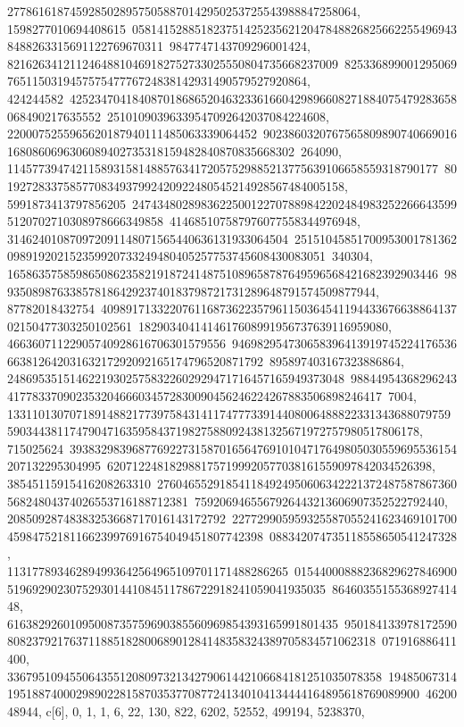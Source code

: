 {{{27786161874592850289575058870142950253725543988847258064, 1598277010694408615\
05814152885182375142523562120478488268256622554969438488263315691122769670311\
9847747143709296001424, 82162634121124648810469182752733025550804735668237009\
825336899001295069765115031945757547776724838142931490579527920864, 424244582\
42523470418408701868652046323361660429896608271884075479283658068490217635552\
25101090396339547092642037084224608, 2200075255965620187940111485063339064452\
90238603207675658098907406690161680860696306089402735318159482840870835668302\
264090, 114577394742115893158148857634172057529885213775639106658559318790177\
80192728337585770834937992420922480545214928567484005158, 5991873413797856205\
24743480289836225001227078898422024849832522666435995120702710308978666349858\
414685107587976077558344976948, 314624010870972091148071565440636131933064504\
25151045851700953001781362098919202152359920733249480405257753745608430083051\
340304, 165863575859865086235821918724148751089658787649596568421682392903446\
9893508987633857818642923740183798721731289648791574509877944, 87782018432754\
40989171332207611687362235796115036454119443367663886413702150477303250102561\
1829034041414617608991956737639116959080, 46636071122905740928616706301579556\
94698295473065839641391974522417653666381264203163217292092165174796520871792\
895897403167323886864, 248695351514622193025758322602929471716457165949373048\
98844954368296243417783370902353204666034572830090456246224267883506898246417\
7004, 13311013070718914882177397584314117477733914408006488822331343688079759\
590344381174790471635958437198275880924381325671972757980517806178, 715025624\
39383298396877692273158701656476910104717649805030559695536154207132295304995\
6207122481829881757199920577038161559097842034526398, 38545115915416208263310\
27604655291854118492495060634222137248758786736056824804374026553716188712381\
7592069465567926443213606907352522792440, 20850928748383253668717016143172792\
22772990595932558705524162346910170045984752181166239976916754049451807742398\
088342074735118558650541247328, 113177893462894993642564965109701171488286265\
01544000888236829627846900519692902307529301441084511786722918241059041935035\
8646035515536892741448, 61638292601095008735759690385560969854393165991801435\
95018413397817259080823792176371188518280068901284148358324389705834571062318\
071916886411400, 336795109455064355120809732134279061442106684181251035078358\
19485067314195188740002989022815870353770877241340104134444164895618769089900\
4620048944}}, {c[6], {0, 1, 1, 6, 22, 130, 822, 6202, 52552, 499194, 5238370, 
}}}
